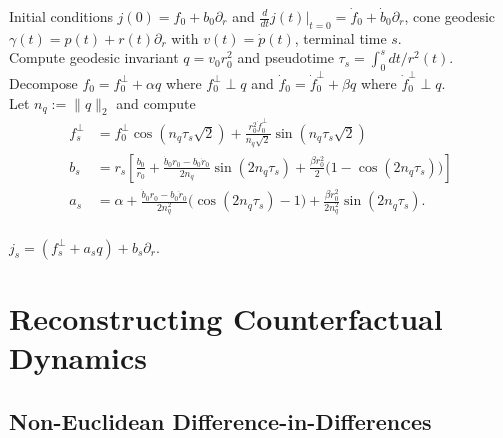 \documentclass{article}
\begin{document}
\begin{algorithm}[H]
    \begin{algorithmic}[1]
        \caption{Jacobi field on $\mathfrak{C}_\Omega$}
        \label{alg: jacobi field}
        \Require Initial conditions $j(0) = f_0 + b_0\partial_r$ and $\frac{d}{dt}j(t)|_{t = 0} = \dot f_0 + \dot b_0 \partial_r$, cone geodesic $\gamma(t) = p(t) + r(t)\partial_r$ with $v(t) = \dot p(t)$, terminal time $s$.\\
        Compute geodesic invariant $q = v_0r_0^2$ and pseudotime $\tau_s = \int_0^sdt/r^2(t)$. \\
        Decompose $f_0 = f_{0}^{\perp} + \alpha q$ where $f_{0}^{\perp} \perp q$ and $\dot f_0 = \dot f_{0}^{\perp} + \beta q$ where $\dot f_{0}^\perp \perp q$.\\
        Let $n_q := \|q\|_2$ and compute 
        \begin{align*}
        f^{\perp}_s &= f_{0}^\perp\cos\left(n_q\tau_s\sqrt{2}
        \right) + \frac{r_0^2\dot f_{0}^{\perp}}{n_q\sqrt{2}}\sin\left(n_q\tau_s\sqrt{2}\right) \\
        b_s &= r_s\left[\frac{b_0}{r_0} + \frac{\dot b_0r_0 - b_0\dot r_0}{2n_q}\sin\left(2n_q\tau_s\right) + \frac{\beta r_0^2}{2} \Big(1- \cos\left(2n_q\tau_s\right)\Big)\right] \\
        a_s &= \alpha + \frac{\dot b_0r_0 - b_0\dot r_0}{2n_q^2}\Big(\cos(2n_q\tau_s)-1\Big) + \frac{\beta r_0^2}{2n_q^2}\sin(2n_q\tau_s).
        \end{align*}
        \\ \Return $j_s = \left(f^{\perp}_s + a_sq\right) + b_s\partial_r$.
    \end{algorithmic}
\end{algorithm}

\section{Reconstructing Counterfactual Dynamics}
\subsection{Non-Euclidean Difference-in-Differences}

\break 
\end{document}
